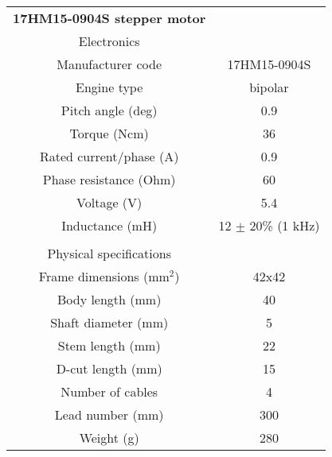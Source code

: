 \begin{minipage}{0.5\textwidth}
    \centering
    \begin{tabular}{cc}
        \textbf{17HM15-0904S stepper motor}&\\
        Electronics&\\
        \hline
        Manufacturer code & 17HM15-0904S\\
        Engine type & bipolar\\
        Pitch angle (deg) & 0.9 \\
        Torque (Ncm)& 36\\
        Rated current/phase (A) & 0.9\\
        Phase resistance (Ohm)& 60\\
        Voltage (V)& 5.4\\
        Inductance (mH)& 12 \(\pm\) 20\% (1 kHz)\\
         & \\
        Physical specifications&\\
        \hline
        Frame dimensions (mm\(^2\))& 42x42 \\
        Body length (mm)& 40 \\
        Shaft diameter (mm)& 5 \\
        Stem length (mm)& 22 \\
        D-cut length (mm)& 15 \\
        Number of cables & 4\\
        Lead number (mm)& 300 \\
        Weight (g) & 280\\
        \hline
    \end{tabular}
    \label{tab:nema_17_specifics}
\end{minipage}


